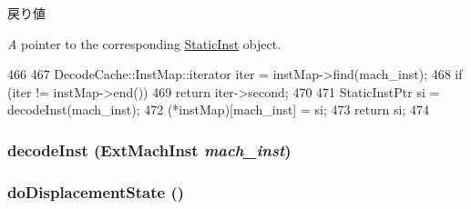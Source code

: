 \begin{DoxyRetVals}{戻り値}
\item[{\em A}]pointer to the corresponding \hyperlink{classStaticInst}{StaticInst} object. \end{DoxyRetVals}



\begin{DoxyCode}
466 {
467     DecodeCache::InstMap::iterator iter = instMap->find(mach_inst);
468     if (iter != instMap->end())
469         return iter->second;
470 
471     StaticInstPtr si = decodeInst(mach_inst);
472     (*instMap)[mach_inst] = si;
473     return si;
474 }
\end{DoxyCode}
\hypertarget{classX86ISA_1_1Decoder_a148768e0e9062eb41f604040d0ea86e6}{
\subsubsection[{decodeInst}]{ decodeInst ({\bf ExtMachInst} {\em mach\_\-inst})}}
\label{classX86ISA_1_1Decoder_a148768e0e9062eb41f604040d0ea86e6}
\hypertarget{classX86ISA_1_1Decoder_a159a4726e8800be2876f6d3100193d4d}{
\subsubsection[{doDisplacementState}]{ doDisplacementState ()}}
\label{classX86ISA_1_1Decoder_a159a4726e8800be2876f6d3100193d4d}



